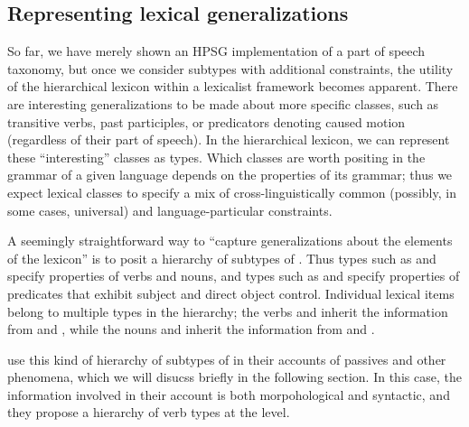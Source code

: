 \documentclass[output=paper
 	        ,biblatex
                ,babelshorthands
                ,newtxmath
                ,draftmode
                ,colorlinks, citecolor=brown
]{langscibook}
\begin{document}
\subsection{Representing lexical generalizations}

So far, we have merely shown an HPSG implementation of a part of speech taxonomy, but once we consider subtypes with additional constraints, the utility of the hierarchical lexicon within a lexicalist framework becomes apparent.
There are interesting generalizations to be made about more specific classes, such as transitive verbs, past participles, or predicators denoting caused motion (regardless of their part of speech).
In the hierarchical lexicon, we can represent these ``interesting'' classes as types.
Which classes are worth positing in the grammar of a given language depends on the properties of its grammar; thus we expect lexical classes to specify a mix of cross-linguistically common (possibly, in some cases, universal) and language-particular constraints.

A seemingly straightforward way to ``capture generalizations about the elements of the lexicon'' is to posit a hierarchy of subtypes of .
Thus types such as  and   specify properties of verbs and nouns, and types such	as  and  specify properties of predicates that exhibit subject and direct object control.
Individual lexical items belong to multiple types in the hierarchy; the verbs  and  inherit the information from  and , while the nouns  and  inherit the information from  and .

\citet{AckermanandWebelhuth1998}
 use this kind of hierarchy of subtypes of  in their accounts of  passives and other phenomena, which we will disucss briefly in the following section.
In this case, the information involved in their account is both morpohological and syntactic, and they propose a hierarchy of verb types at the  level.
\end{document}

